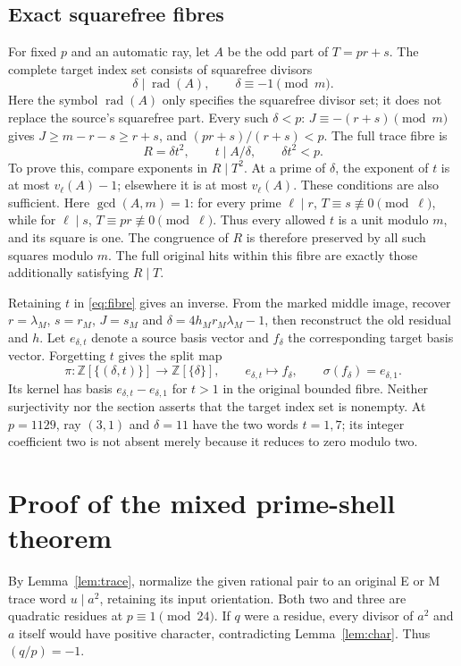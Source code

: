 \subsection{Exact squarefree fibres}
For fixed $p$ and an automatic ray, let $A$ be the odd part of $T=pr+s$.
The complete target index set consists of squarefree divisors
\[
 \delta\mid\operatorname{rad}(A),\qquad \delta\equiv-1\pmod m.
\]
Here the symbol $\operatorname{rad}(A)$ only specifies the squarefree divisor
set; it does not replace the source's squarefree part. Every such $\delta<p$:
$J\equiv-(r+s)\pmod m$ gives
$J\ge m-r-s\ge r+s$, and $(pr+s)/(r+s)<p$.
The full trace fibre is
\begin{equation}\label{eq:fibre}
 R=\delta t^2,
 \qquad t\mid A/\delta,
 \qquad \delta t^2<p.
\end{equation}
To prove this, compare exponents in $R\mid T^2$. At a prime of $\delta$, the
exponent of $t$ is at most $v_\ell(A)-1$; elsewhere it is at most $v_\ell(A)$.
These conditions are also sufficient. Here \(\gcd(A,m)=1\): for every prime
\(\ell\mid r\), \(T\equiv s\not\equiv0\pmod\ell\), while for
\(\ell\mid s\), \(T\equiv pr\not\equiv0\pmod\ell\). Thus every allowed \(t\)
is a unit modulo \(m\), and its square is one. The congruence of $R$ is
therefore preserved by all such squares modulo $m$. The full original hits within this fibre are
exactly those additionally satisfying $R\mid T$.

Retaining $t$ in \eqref{eq:fibre} gives an inverse. From the marked middle
image, recover $r=\lambda_M$, $s=r_M$, $J=s_M$ and
$\delta=4h_Mr_M\lambda_M-1$, then reconstruct the old residual and $h$.
Let \(e_{\delta,t}\) denote a source basis vector and \(f_\delta\) the
corresponding target basis vector. Forgetting \(t\) gives the split map
\[
 \pi:\mathbb Z[\{(\delta,t)\}]\longrightarrow\mathbb Z[\{\delta\}],
 \qquad e_{\delta,t}\longmapsto f_\delta,
 \qquad \sigma(f_\delta)=e_{\delta,1}.
\]
Its kernel has basis \(e_{\delta,t}-e_{\delta,1}\) for \(t>1\) in the
original bounded fibre.
Neither surjectivity nor the section asserts that the target index set is
nonempty. At $p=1129$, ray $(3,1)$ and $\delta=11$ have the two words $t=1,7$;
its integer coefficient two is not absent merely because it reduces to zero
modulo two.

\section{Proof of the mixed prime-shell theorem}\label{sec:mixed}
By Lemma~\ref{lem:trace}, normalize the given rational pair to an original
E or M trace word $u\mid a^2$, retaining its input orientation. Both two and
three are quadratic residues at $p\equiv1\pmod{24}$. If $q$ were a residue,
every divisor of $a^2$ and $a$ itself would have positive character, contradicting
Lemma~\ref{lem:char}. Thus $(q/p)=-1$.

